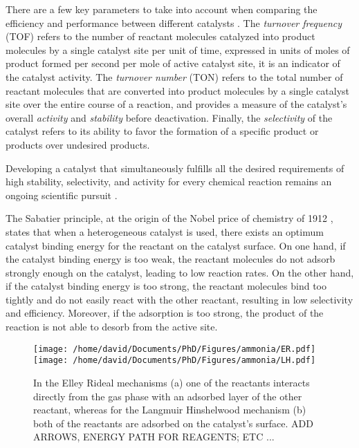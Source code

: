 There are a few key parameters to take into account when comparing the efficiency and performance between different catalysts \parencite{Boudart1995, ZHANG2019, WACHS2022}.
The \textit{turnover frequency} (TOF) refers to the number of reactant molecules catalyzed into product molecules by a single catalyst site per unit of time, expressed in units of moles of product formed per second per mole of active catalyst site, it is an indicator of the catalyst activity.
The \textit{turnover number} (TON) refers to the total number of reactant molecules that are converted into product molecules by a single catalyst site over the entire course of a reaction, and provides a measure of the catalyst's overall \textit{activity} and \textit{stability} before deactivation.
Finally, the \textit{selectivity} of the catalyst refers to its ability to favor the formation of a specific product or products over undesired products.

Developing a catalyst that simultaneously fulfills all the desired requirements of high stability, selectivity, and activity for every chemical reaction remains an ongoing scientific pursuit \parencite{Hagen2016}.

The Sabatier principle, at the origin of the Nobel price of chemistry of 1912 \parencite{Che2013}, states that when a heterogeneous catalyst is used, there exists an optimum catalyst binding energy for the reactant on the catalyst surface.
On one hand, if the catalyst binding energy is too weak, the reactant molecules do not adsorb strongly enough on the catalyst, leading to low reaction rates.
On the other hand, if the catalyst binding energy is too strong, the reactant molecules bind too tightly and do not easily react with the other reactant, resulting in low selectivity and efficiency.
Moreover, if the adsorption is too strong, the product of the reaction is not able to desorb from the active site.

\begin{figure}[!htb]
    \centering
    \texttt{[image: /home/david/Documents/PhD/Figures/ammonia/ER.pdf]}
    \texttt{[image: /home/david/Documents/PhD/Figures/ammonia/LH.pdf]}
    \caption{
        In the Elley Rideal mechanisms (a) one of the reactants interacts directly from the gas phase with an adsorbed layer of the other reactant, whereas for the Langmuir Hinshelwood mechanism (b) both of the reactants are adsorbed on the catalyst's surface.
        \textcolor{Important}{ADD ARROWS, ENERGY PATH FOR REAGENTS; ETC ...}
    }
    \label{fig:Mechanisms}
\end{figure}

